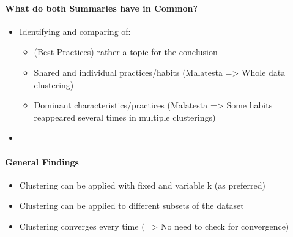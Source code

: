 \paragraph*{What do both Summaries have in Common?}
\begin{itemize}
    \item Identifying and comparing of:
    \begin{itemize}
        \item (Best Practices) rather a topic for the conclusion
        \item Shared and individual practices/habits (Malatesta => Whole data clustering)
        \item Dominant characteristics/practices (Malatesta => Some habits reappeared several times in multiple clusterings)
    \end{itemize}
    \item
\end{itemize}

\paragraph*{General Findings}
\begin{itemize}
    \item Clustering can be applied with fixed and variable k (as preferred)
    \item Clustering can be applied to different subsets of the dataset
    \item Clustering converges every time (=> No need to check for convergence)
\end{itemize}

